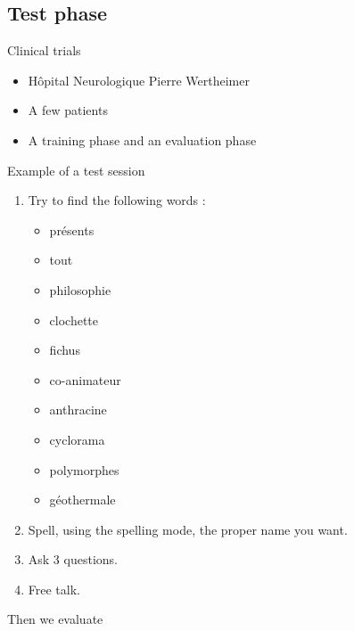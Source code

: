 \documentclass[graphics]{beamer}
\begin{document}
\subsection{Test phase}

\begin{frame}{Clinical trials}
	\begin{center}
		\begin{itemize}
			\item Hôpital Neurologique Pierre Wertheimer
			\item A few patients
			\item A training phase and an evaluation phase
		\end{itemize}
	\end{center}
\end{frame}



\begin{frame}{Example of a test session}
	\begin{enumerate}
		\item Try to find the following words :
			\begin{itemize}
			\item présents
			\item tout
			\item philosophie
			\item clochette
			\item fichus
			\item co-animateur
			\item anthracine
			\item cyclorama
			\item polymorphes
			\item géothermale
		\end{itemize}
	\pause
	\item Spell, using the spelling mode, the proper name you want.
	\pause
	\item Ask 3 questions.
	\pause
	\item Free talk.
	\end{enumerate}
	Then we evaluate
\end{frame}
\end{document}
